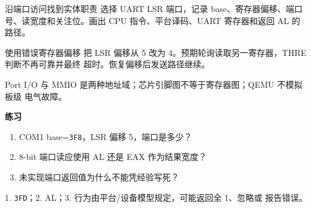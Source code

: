 
\begin{experimentbox}{沿端口访问找到实体职责}
选择 UART LSR 端口，记录 base、寄存器偏移、端口号、读宽度和关注位。画出 CPU
 指令、平台译码、UART 寄存器和返回 AL 的路径。
\end{experimentbox}

\begin{faultinjectionbox}{使用错误寄存器偏移}
把 LSR 偏移从 5 改为 4。预期轮询读取另一寄存器，THRE 判断不再可靠并最终
超时。恢复偏移后发送路径继续。
\end{faultinjectionbox}

\begin{pitfallbox}
Port I/O 与 MMIO 是两种地址域；芯片引脚图不等于寄存器图；QEMU 不模拟板级
电气故障。
\end{pitfallbox}

\textbf{练习}
\begin{enumerate}[leftmargin=2.2em]
  \item COM1 base=\texttt{3F8}，LSR 偏移 5，端口是多少？
  \item 8-bit 端口读应使用 AL 还是 EAX 作为结果宽度？
  \item 未实现端口返回值为什么不能凭经验写死？
\end{enumerate}
\begin{answerbox}
1. \texttt{3FD}；2. AL；3. 行为由平台/设备模型规定，可能返回全 1、忽略或
报告错误。
\end{answerbox}
